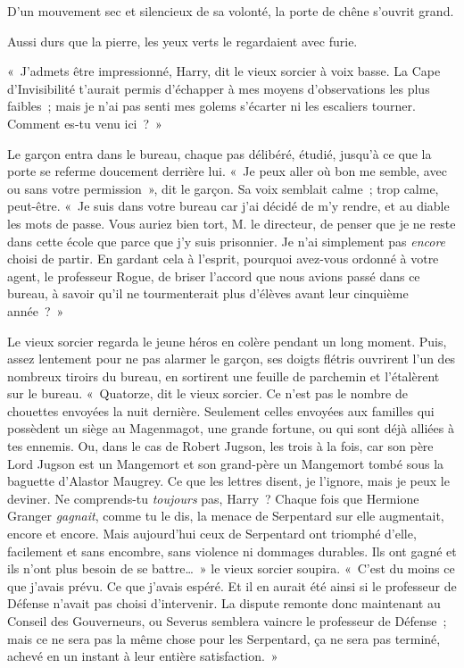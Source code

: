 D'un mouvement sec et silencieux de sa volonté, la porte de chêne s'ouvrit grand.

Aussi durs que la pierre, les yeux verts le regardaient avec furie.

«~J'admets être impressionné, Harry, dit le vieux sorcier à voix basse. La Cape d'Invisibilité t'aurait permis d'échapper à mes moyens d'observations les plus faibles~; mais je n'ai pas senti mes golems s'écarter ni les escaliers tourner. Comment es-tu venu ici~?~»

Le garçon entra dans le bureau, chaque pas délibéré, étudié, jusqu'à ce que la porte se referme doucement derrière lui. «~Je peux aller où bon me semble, avec ou sans votre permission~», dit le garçon. Sa voix semblait calme~; trop calme, peut-être. «~Je suis dans votre bureau car j'ai décidé de m'y rendre, et au diable les mots de passe. Vous auriez bien tort, M. le directeur, de penser que je ne reste dans cette école que parce que j'y suis prisonnier. Je n'ai simplement pas \emph{encore} choisi de partir. En gardant cela à l'esprit, pourquoi avez-vous ordonné à votre agent, le professeur Rogue, de briser l'accord que nous avions passé dans ce bureau, à savoir qu'il ne tourmenterait plus d'élèves avant leur cinquième année~?~»

Le vieux sorcier regarda le jeune héros en colère pendant un long moment. Puis, assez lentement pour ne pas alarmer le garçon, ses doigts flétris ouvrirent l'un des nombreux tiroirs du bureau, en sortirent une feuille de parchemin et l'étalèrent sur le bureau. «~Quatorze, dit le vieux sorcier. Ce n'est pas le nombre de chouettes envoyées la nuit dernière. Seulement celles envoyées aux familles qui possèdent un siège au Magenmagot, une grande fortune, ou qui sont déjà alliées à tes ennemis. Ou, dans le cas de Robert Jugson, les trois à la fois, car son père Lord Jugson est un Mangemort et son grand-père un Mangemort tombé sous la baguette d'Alastor Maugrey. Ce que les lettres disent, je l'ignore, mais je peux le deviner. Ne comprends-tu \emph{toujours} pas, Harry~? Chaque fois que Hermione Granger \emph{gagnait}, comme tu le dis, la menace de Serpentard sur elle augmentait, encore et encore. Mais aujourd'hui ceux de Serpentard ont triomphé d'elle, facilement et sans encombre, sans violence ni dommages durables. Ils ont gagné et ils n'ont plus besoin de se battre…~» le vieux sorcier soupira. «~C'est du moins ce que j'avais prévu. Ce que j'avais espéré. Et il en aurait été ainsi si le professeur de Défense n'avait pas choisi d'intervenir. La dispute remonte donc maintenant au Conseil des Gouverneurs, ou Severus semblera vaincre le professeur de Défense~; mais ce ne sera pas la même chose pour les Serpentard, ça ne sera pas terminé, achevé en un instant à leur entière satisfaction.~»

